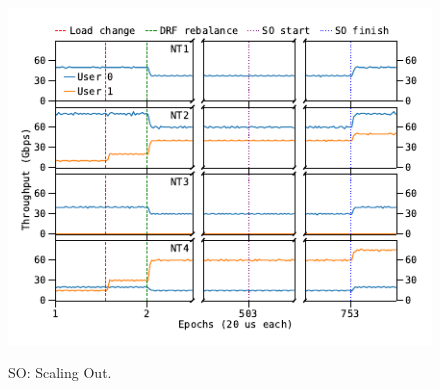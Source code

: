 {
\begin{figure}[th]
\begin{center}
\centerline{\includegraphics[width=\textwidth]{snic/Figures/drf.pdf}}
{
SO: Scaling Out.
}
\end{center}
\end{figure}
}